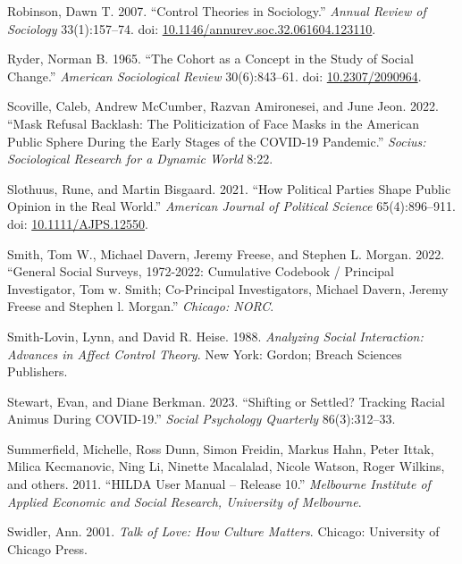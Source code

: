 \documentclass[
  11pt,
]{article}
\newlength{\cslhangindent}
\newenvironment{CSLReferences}[2] %
 {\begin{list}{}{%
  \setlength{\itemindent}{0pt}
  \setlength{\leftmargin}{0pt}
  \setlength{\parsep}{0pt}
  \ifodd #1
   \setlength{\leftmargin}{\cslhangindent}
   \setlength{\itemindent}{-1\cslhangindent}
  \fi
  \setlength{\itemsep}{#2\baselineskip}}}
 {\end{list}}
\begin{document}
\begin{CSLReferences}{1}{1}
Robinson, Dawn T. 2007. {``Control {Theories} in {Sociology}.''}
\emph{Annual Review of Sociology} 33(1):157--74. doi:
\href{https://doi.org/10.1146/annurev.soc.32.061604.123110}{10.1146/annurev.soc.32.061604.123110}.

Ryder, Norman B. 1965. {``The {Cohort} as a {Concept} in the {Study} of
{Social} {Change}.''} \emph{American Sociological Review} 30(6):843--61.
doi: \href{https://doi.org/10.2307/2090964}{10.2307/2090964}.

Scoville, Caleb, Andrew McCumber, Razvan Amironesei, and June Jeon.
2022. {``Mask {Refusal} {Backlash}: {The} {Politicization} of {Face}
{Masks} in the {American} {Public} {Sphere} During the {Early} {Stages}
of the {COVID}-19 {Pandemic}.''} \emph{Socius: Sociological Research for
a Dynamic World} 8:22.

Slothuus, Rune, and Martin Bisgaard. 2021. {``How {Political} {Parties}
{Shape} {Public} {Opinion} in the {Real} {World}.''} \emph{American
Journal of Political Science} 65(4):896--911. doi:
\href{https://doi.org/10.1111/AJPS.12550}{10.1111/AJPS.12550}.

Smith, Tom W., Michael Davern, Jeremy Freese, and Stephen L. Morgan.
2022. {``General Social Surveys, 1972-2022: Cumulative Codebook /
Principal Investigator, Tom w. Smith; Co-Principal Investigators,
Michael Davern, Jeremy Freese and Stephen l. Morgan.''} \emph{Chicago:
NORC}.

Smith-Lovin, Lynn, and David R. Heise. 1988. \emph{Analyzing {Social}
{Interaction}: {Advances} in {Affect} {Control} {Theory}}. New York:
Gordon; Breach Sciences Publishers.

Stewart, Evan, and Diane Berkman. 2023. {``Shifting or Settled? Tracking
Racial Animus During COVID-19.''} \emph{Social Psychology Quarterly}
86(3):312--33.

Summerfield, Michelle, Ross Dunn, Simon Freidin, Markus Hahn, Peter
Ittak, Milica Kecmanovic, Ning Li, Ninette Macalalad, Nicole Watson,
Roger Wilkins, and others. 2011. {``HILDA User Manual -- Release 10.''}
\emph{Melbourne Institute of Applied Economic and Social Research,
University of Melbourne}.

Swidler, Ann. 2001. \emph{Talk of {Love}: {How} {Culture} {Matters}}.
Chicago: University of Chicago Press.


\end{CSLReferences}
\end{document}
